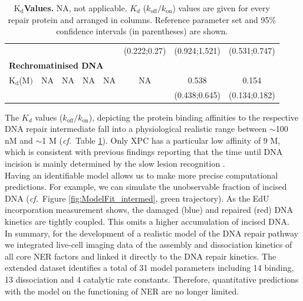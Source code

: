 \begin{landscape}
\begin{table}[t]
{\begin{tabular}[angle=90]{p{2cm}ccccccc}
	&                               &                              &                           &                          &(0.222;0.27)     &  (0.924;1.521)  & (0.531;0.747)  \\
	\multicolumn{8}{l}{\textbf{Rechromatinised DNA}} \\
	$\text{K}_{\text{d}}$({\textmu}$\text{M})$                                                  & NA                          &NA                         & NA                      &NA                      &NA                         &0.538                    &0.154     \\
	&                               &                              &                           &                          &                            &  (0.438;0.645)  & (0.134;0.182)  \\
	\hline
\end{tabular}}

\begin{adjustwidth}{-1.1 cm}{}
\captionsetup{width=1.24\textwidth}
\caption{\textbf{$\text{K}_{\text{d}}$Values.} NA, not applicable. $K_d$ ($k_{\text{off}}/k_{\text{on}}$) values are given for every repair protein and arranged in columns. Reference parameter set and 95\% confidence intervals (in parentheses) are shown.}\label{tab:KdValues}
\end{adjustwidth}
\end{table}

\end{landscape}

The $K_d$ values ($k_{\text{off}}/k_{\text{on}}$), depicting the protein binding affinities to the respective DNA repair intermediate fall into a physiological realistic range between $\sim$100 nM and $\sim$1 \textmu M (\textit{cf.}\ Table \ref{tab:KdValues}). Only XPC has a particular low affinity of 9 \textmu M, which is consistent with previous findings reporting that the time until DNA incision is mainly determined by the slow lesion recognition \cite{Luijsterburg2010}.\\        
Having an identifiable model allows us to make more precise computational predictions. For example, we can simulate the unobservable fraction of incised DNA (\textit{cf.}\ Figure \ref{fig:ModelFit_intermed}, green trajectory). As the EdU incorporation measurement shows, the damaged (blue) and repaired (red) DNA kinetics are tightly coupled. This omits a higher accumulation of incised DNA.\\ 


In summary, for the development of a realistic model of the DNA repair pathway we integrated live-cell imaging data of the assembly and dissociation kinetics of all core NER factors and linked it directly to the DNA repair kinetics. The extended dataset identifies a total of 31 model parameters including 14 binding, 13 dissociation and 4 catalytic rate constants. Therefore, quantitative predictions with the model on the functioning of NER are no longer limited.  

